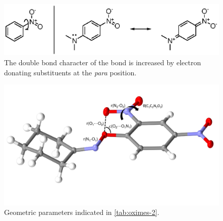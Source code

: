 \begin{refsection}
\begin{figure}
    \centering
    \includegraphics[scale=0.74]{Figures/nitro-push-pull.eps}
    \caption[Resonance effects in \textit{para} substituted nitrobenzenes.]{The double bond character of the  bond is increased by electron donating substituents at the \textit{para} position.}\label{fig:nitro-push-pull}
\end{figure}

\begin{figure}
	\centering
	\includegraphics[width=0.8\linewidth]{Figures/oxime-bond-params.pdf}
	\caption{Geometric parameters indicated in \cref{tab:oximes-2}.}\label{fig:oximes-2}
\end{figure}


\end{refsection}
